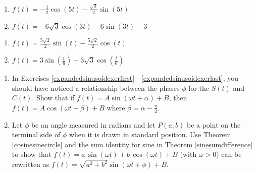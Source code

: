 \documentclass{ximera}
\begin{document}
\begin{multicols}{2}

\begin{enumerate}

\setcounter{enumi}{\value{HW}}

\item  $f(t) = -\frac{1}{2} \cos(5t) -\frac{\sqrt{3}}{2} \sin(5t)$
\item  $f(t) = -6\sqrt{3} \cos(3t) - 6\sin(3t) - 3$  

\setcounter{HW}{\value{enumi}}

\end{enumerate}

\end{multicols}

\begin{multicols}{2}

\begin{enumerate}

\setcounter{enumi}{\value{HW}}

\item  $f(t) =  \frac{5\sqrt{2}}{2} \sin(t)  -\frac{5\sqrt{2}}{2} \cos(t)$
\item  $f(t) =3 \sin \left(\frac{t}{6}\right) -3\sqrt{3} \cos \left(\frac{t}{6}\right)$   \label{expandedsinusoidexerlast}

\setcounter{HW}{\value{enumi}}

\end{enumerate}

\end{multicols}


\begin{enumerate}

\setcounter{enumi}{\value{HW}}

\item In Exercises \ref{expandedsinusoidexerfirst} - \ref{expandedsinusoidexerlast}, you should have noticed a relationship between the phases $\phi$ for the $S(t)$ and $C(t)$.  Show that if $f(t) = A \sin(\omega t + \alpha) + B$, then $f(t) = A \cos(\omega t + \beta) + B$ where $\beta = \alpha - \frac{\pi}{2}$. 
\label{sinusoidexercise1}

\item Let $\phi$ be an angle measured in radians and let $P(a,b)$ be a point on the terminal side of $\phi$ when it is drawn in standard position.  Use Theorem \ref{cosinesinecircle} and the sum identity for sine in Theorem \ref{sinesumdifference} to show that  $f(t) = a \, \sin(\omega t) + b\, \cos(\omega t) + B$ (with  $\omega > 0$) can be rewritten as $f(t) = \sqrt{a^{2} + b^{2}}\sin(\omega t + \phi) + B$.
\label{sinusoidexercise2}

\setcounter{HW}{\value{enumi}}

\end{enumerate}
\end{document}
